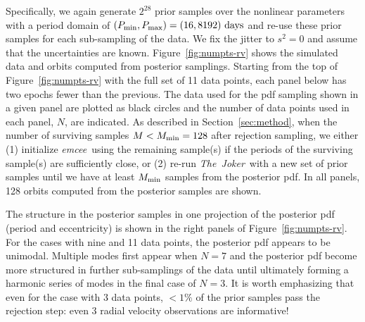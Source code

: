 \documentclass[manuscript, letterpaper]{aastex6}
\newcommand{\project}[1]{\textsl{#1}}
\newcommand{\samplername}{\project{The~Joker}}
\newcommand{\emcee}{\project{emcee}}
\newcommand{\sectionname}{Section}
\newcommand{\figname}{Figure}
\begin{document}
Specifically, we again generate $2^{28}$ prior samples over the nonlinear
parameters with a period domain of $(P_{\rm min}, P_{\rm max}) = (16, 8192)~{\rm
days}$ and re-use these prior samples for each sub-sampling of the data.
We fix the jitter to $s^2 = 0$ and assume that the uncertainties are known.
\figname~\ref{fig:numpts-rv} shows the simulated data and orbits computed from
posterior samplings.
Starting from the top of \figname~\ref{fig:numpts-rv} with the full set of 11
data points, each panel below has two epochs fewer than the previous.
The data used for the pdf sampling shown in a given panel are plotted as black
circles and the number of data points used in each panel, $N$, are indicated.
As described in \sectionname~\ref{sec:method}, when the number of surviving
samples $M < M_{\rm min}=128$ after rejection sampling, we either (1) initialize
\emcee\ using the remaining sample(s) if the periods of the surviving sample(s)
are sufficiently close, or (2) re-run \samplername\ with a new set of prior
samples until we have at least $M_{\rm min}$ samples from the posterior pdf.
In all panels, 128 orbits computed from the posterior samples are shown.

The structure in the posterior samples in one projection of the posterior pdf
(period and eccentricity) is
shown in the right panels of \figname~\ref{fig:numpts-rv}.
For the cases with nine and 11 data points, the posterior pdf appears to be
unimodal.
Multiple modes first appear when $N=7$ and the posterior pdf become more
structured in further sub-samplings of the data until ultimately forming a
harmonic series of modes in the final case of $N=3$.
It is worth emphasizing that even for the case with 3 data points, $<1\%$ of the
prior samples pass the rejection step:
even 3 radial velocity observations are informative!
\end{document}
